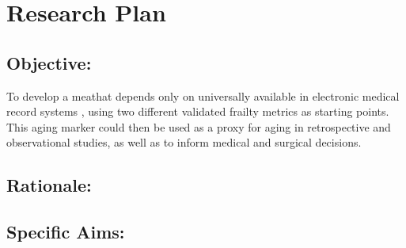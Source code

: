 \section{Research Plan }\label{research-plan}


\subsection{Objective:}\label{objective}
  
To develop a meathat depends only on universally available in electronic medical record systems ,
using two different validated frailty metrics as starting points. This
aging marker could then be used as a proxy for aging in retrospective
and observational studies, as well as to inform medical and surgical
decisions.


\subsection{Rationale:}\label{rationale}

\subsection{Specific Aims:}\label{specific-aims}
